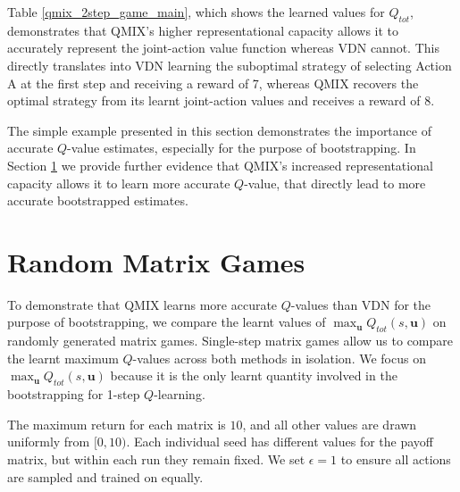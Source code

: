 \documentclass[twoside,11pt]{article}
\begin{document}
Table \ref{qmix_2step_game_main}, which shows the learned values for $Q_{tot}$, demonstrates that QMIX's higher representational capacity allows it to accurately represent the joint-action value function whereas VDN cannot. This directly translates into VDN learning the suboptimal strategy of selecting Action A at the first step and receiving a reward of 7, whereas QMIX recovers the optimal strategy from its learnt joint-action values and receives a reward of 8. 

The simple example presented in this section demonstrates the importance of accurate $Q$-value estimates, especially for the purpose of bootstrapping.
In Section \ref{sec:rnd_matrix} we provide further evidence that QMIX's increased representational capacity allows it to learn more accurate $Q$-value, that directly lead to more accurate bootstrapped estimates.


 \section{Random Matrix Games}
\label{sec:rnd_matrix}

To demonstrate that QMIX learns more accurate $Q$-values than VDN for the purpose of bootstrapping, we compare 
the learnt values of $\max_{\mathbf{u}} Q_{tot}(s, \mathbf{u})$
on randomly generated matrix games.
Single-step matrix games allow us to compare the learnt maximum $Q$-values across both methods in isolation.
We focus on $\max_{\mathbf{u}} Q_{tot}(s, \mathbf{u})$ because it is the only learnt quantity involved in the bootstrapping for 1-step $Q$-learning.

The maximum return for each matrix is $10$, and all other values are drawn uniformly from $[0,10)$.
Each individual seed has different values for the payoff matrix, but within each run they remain fixed.
We set $\epsilon=1$ to ensure all actions are sampled and trained on equally.
\end{document}
